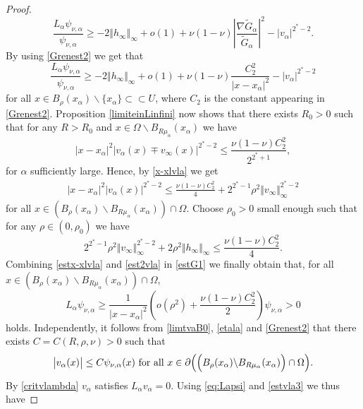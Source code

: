 \documentclass[10pt]{amsart}
\numberwithin{equation}{section}
\newcommand{\Om}{\Omega}
\newcommand{\ma}{\mu_\alpha}
\def \bb{\hbox}
\def \vv {\mathbb{\Vert}}
\def \xl{x_\alpha}
\def\la{\alpha}
\def \ma{\mu_{\alpha}}
\def \tg{\tilde{G}}
\def \va{v_{\alpha}}
\def \ro{\rho}
\theoremstyle{plain}
\theoremstyle{remark}
\begin{document}
\begin{proof}
\begin{equation*}
\frac{L_{\la}\psi_{\nu,\la}}{\psi_{\nu,\la}} \ge - 2 \Vert h_\infty\Vert_{\infty} + o(1) + \nu(1-\nu) \left|\frac{\nabla \tg_{\la}}{\tg_{\la}}\right|^2 -|v_{\la}|^{2^*-2}.
\end{equation*}
By using  \eqref{Grenest2} we get that 
\begin{equation}\label{estG1}
\frac{L_{\la}\psi_{\nu,\la}}{\psi_{\nu,\la}}\geq - 2 \Vert h_\infty\Vert_{\infty} + o(1) +\nu(1-\nu)\frac{C_2^2}{ |x-\xl|^{2}}-|v_{\la}|^{2^*-2}
\end{equation}
for all $x\in B_{\ro}(\xl)\backslash \{\xl\}\subset\subset U$, where $C_2$ is the constant appearing in \eqref{Grenest2}. Proposition \ref{limiteinLinfini} now shows that there exists $R_0>0$ such that for any $R>R_0$ and $x\in \Om\backslash B_{R\ma}(\xl)$ we have
\begin{equation}\label{x-xlvla}
	|x-\xl|^{2}\big|v_{\la}(x)\mp v_{\infty}(x)\big|^{2^*-2}\leq  \frac{\nu(1-\nu)C_2^2}{2^{2^*+1}},
\end{equation}
 for $\la$ sufficiently large. Hence, by \eqref{x-xlvla} we get  
\begin{eqnarray}\label{estx-xlvla}
|x-\xl|^2\big|v_{\la}(x)\big|^{2^*-2} \le \frac{\nu(1-\nu)C_2^2}{4}+2^{2^*-1}\ro^2\vv v_{\infty}\vv_{\infty}^{2^*-2}
\end{eqnarray}
for all $
x\in \left( B_{\ro}(\xl)\backslash B_{R\ma}(\xl)\right)\cap \Om$. Choose $\ro_0>0$ small enough such that for any $\ro \in (0,\ro_0)$ we have
\begin{equation}\label{est2vla}
2^{2^*-1} \ro^2\vv v_{\infty}\vv_{\infty}^{2^*-2} + 2 \rho^2 \Vert h_\infty\Vert_{\infty} \leq \frac{\nu(1-\nu)C_2^2}{4}.
\end{equation}
Combining \eqref{estx-xlvla} and \eqref{est2vla} in \eqref{estG1} we finally obtain that, for all $x\in \left( B_{\ro}(\xl)\backslash B_{R\ma}(\xl)\right)\cap \Om$,
\begin{equation} \label{eq:Lapsi}
 L_{\la}\psi_{\nu,\la} \ge \frac{1}{|x-\xl|^{2}}\left( o(\rho^2) + \frac{\nu(1-\nu)C_2^2}{2} \right)\psi_{\nu,\la} >0
\end{equation}
holds. Independently, it follows from \eqref{limtvaB0}, \eqref{etala} and \eqref{Grenest2} that there exists $C = C(R,\rho, \nu) >0$ such that 
\begin{equation}\label{estvla3}
	\big| v_{\la}(x)\big| \leq  C \psi_{\nu,\la}(x) \bb{ for all } x\in \partial \Big( \Big( B_{\ro}(\xl) \backslash B_{R\ma}(\xl)\Big) \cap \Om\Big).
\end{equation}
By \eqref{critvlambda} $\va$ satisfies $L_\alpha \va = 0$. Using \eqref{eq:Lapsi} and \eqref{estvla3} we thus have 

\end{proof}
\end{document}
